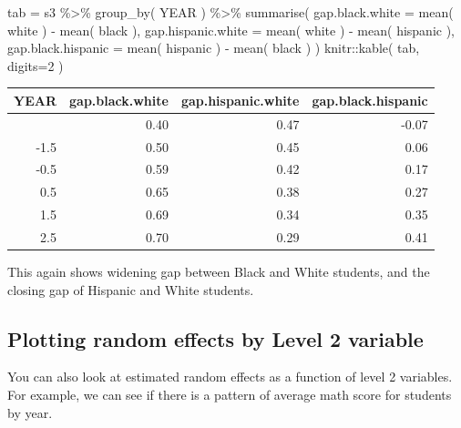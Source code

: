 \documentclass[
  letterpaper,
  DIV=11,
  numbers=noendperiod]{scrreprt}
\newenvironment{Shaded}{\begin{snugshade}}{\end{snugshade}}
\newcommand{\AttributeTok}[1]{\textcolor[rgb]{0.49,0.56,0.16}{#1}}
\newcommand{\DecValTok}[1]{\textcolor[rgb]{0.25,0.63,0.44}{#1}}
\newcommand{\FunctionTok}[1]{\textcolor[rgb]{0.02,0.16,0.49}{#1}}
\newcommand{\NormalTok}[1]{\textcolor[rgb]{0.00,0.44,0.13}{#1}}
\newcommand{\OtherTok}[1]{\textcolor[rgb]{0.00,0.44,0.13}{#1}}
\newcommand{\SpecialCharTok}[1]{\textcolor[rgb]{0.25,0.44,0.63}{#1}}
\begin{document}
\begin{Shaded}
\begin{Highlighting}[]
\NormalTok{tab }\OtherTok{=}\NormalTok{ s3 }\SpecialCharTok{\%\textgreater{}\%} \FunctionTok{group\_by}\NormalTok{( YEAR ) }\SpecialCharTok{\%\textgreater{}\%} 
  \FunctionTok{summarise}\NormalTok{( }\AttributeTok{gap.black.white =} \FunctionTok{mean}\NormalTok{( white ) }\SpecialCharTok{{-}} \FunctionTok{mean}\NormalTok{( black ),}
             \AttributeTok{gap.hispanic.white =} \FunctionTok{mean}\NormalTok{( white ) }\SpecialCharTok{{-}} \FunctionTok{mean}\NormalTok{( hispanic ),}
             \AttributeTok{gap.black.hispanic =} \FunctionTok{mean}\NormalTok{( hispanic ) }\SpecialCharTok{{-}} \FunctionTok{mean}\NormalTok{( black ) )}
\NormalTok{knitr}\SpecialCharTok{::}\FunctionTok{kable}\NormalTok{( tab, }\AttributeTok{digits=}\DecValTok{2}\NormalTok{ )}
\end{Highlighting}
\end{Shaded}

\begin{longtable}[]{@{}rrrr@{}}
\toprule\noalign{}
YEAR & gap.black.white & gap.hispanic.white & gap.black.hispanic \\
\midrule\noalign{}
\endhead
\bottomrule\noalign{}
\endlastfoot
-2.5 & 0.40 & 0.47 & -0.07 \\
-1.5 & 0.50 & 0.45 & 0.06 \\
-0.5 & 0.59 & 0.42 & 0.17 \\
0.5 & 0.65 & 0.38 & 0.27 \\
1.5 & 0.69 & 0.34 & 0.35 \\
2.5 & 0.70 & 0.29 & 0.41 \\
\end{longtable}

This again shows widening gap between Black and White students, and the
closing gap of Hispanic and White students.

\hypertarget{plotting-random-effects-by-level-2-variable}{%
\subsection{Plotting random effects by Level 2
variable}\label{plotting-random-effects-by-level-2-variable}}

You can also look at estimated random effects as a function of level 2
variables. For example, we can see if there is a pattern of average math
score for students by year.
\end{document}
